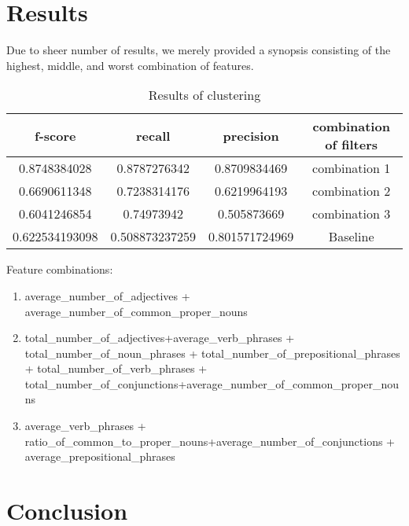 \documentclass[]{article}
\begin{document}
\section{Results}

Due to sheer number of results, we merely provided a synopsis consisting of the highest, middle, and worst combination of features.

\begin{table}[!htbp]
	\begin{center}
		\begin{tabular}{| c | c | c | c |} \hline
			f-score & recall & precision & combination of filters \\
			\hline
			0.8748384028 & 0.8787276342 & 0.8709834469 & combination 1\\
			0.6690611348 & 0.7238314176 & 0.6219964193 & combination 2 \\
			0.6041246854 & 0.74973942 & 0.505873669 &	combination 3 \\
			0.622534193098 & 0.508873237259 & 0.801571724969 & Baseline \\
			\hline
		\end{tabular}
	\end{center}
	\caption{Results of clustering}
	\label{table:features2}
\end{table}

Feature combinations:

\begin{enumerate}
	\item  average\_number\_of\_adjectives + average\_number\_of\_common\_proper\_nouns
	\item total\_number\_of\_adjectives+average\_verb\_phrases + total\_number\_of\_noun\_phrases + total\_number\_of\_prepositional\_phrases + total\_number\_of\_verb\_phrases + total\_number\_of\_conjunctions+average\_number\_of\_common\_proper\_nouns
	\item average\_verb\_phrases + ratio\_of\_common\_to\_proper\_nouns+average\_number\_of\_conjunctions + average\_prepositional\_phrases
\end{enumerate}

\section{Conclusion}


\printbibliography
\end{document}
